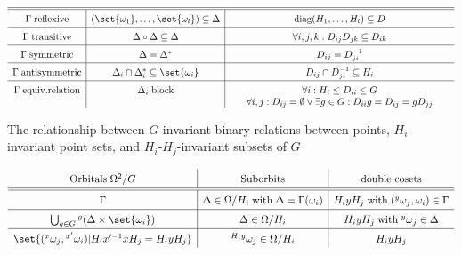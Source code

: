 \documentclass[fontsize=11pt,fleqn,a4paper]{scrartcl}
\begin{document}
\begin{landscape}
\begin{table}[htp]
\[\begin{array}{ c | c | c}
\hline
\hline

\Gamma \;\text{reflexive} & (\set{\omega_1},\ldots,\set{\omega_l})\subseteq\Delta & \diag(H_1,\ldots,H_l) \subseteq D \\

\hline

\Gamma \;\text{transitive} & \Delta\circ\Delta\subseteq\Delta & \forall i,j,k: D_{ij}D_{jk}\subseteq D_{ik} \\

\hline

\Gamma \;\text{symmetric} & \Delta=\Delta^\ast & D_{ij}=D_{ji}^{-1} \\

\hline

\Gamma \;\text{antisymmetric} & \Delta_i\cap\Delta_i^\ast \subseteq\set{\omega_i} & D_{ij}\cap D_{ji}^{-1} \subseteq H_i \\

\hline

\Gamma \;\text{equiv.relation} & \Delta_i \;\text{block} & \parbox[t]{8cm}{\centering $\forall i: H_i\leq D_{ii}\leq G $ \\ $\forall i,j: D_{ij}=\emptyset \vee \exists g\in G: D_{ii}g=D_{ij}=gD_{jj}$} \\
\end{array}\]

\caption{The relationship between $G$-invariant binary relations between points, $H_i$-invariant point sets, and $H_i$-$H_j$-invariant subsets of $G$}
\label{dictionary:table}
\end{table}

\begin{table}[htp]
\[\renewcommand{\arraystretch}{1.5}
\begin{array}{ c | c | c}
\text{Orbitals}\;\Omega^2/G & \text{Suborbits} & \text{double cosets} \\

\hline
\hline

\Gamma & \Delta\in \Omega/H_i\;\text{with}\;\Delta=\Gamma(\omega_i) & H_i y H_j\;\text{with}\;({^y \omega_j},\omega_i)\in\Gamma \\

\hline

\bigcup_{g\in G} {^g(\Delta\times\set{\omega_i})} & \Delta\in \Omega/H_i & H_i y H_j\;\text{with}\;{^y \omega_j} \in \Delta \\

\hline

\set{({^x\omega_j}, {^{x'}\omega_i}) | H_i x'^{-1}x H_j = H_i y H_j} & {^{H_i y}\omega_j}\in \Omega/H_i & H_i y H_j \\


\end{array}\]
\end{table}
\end{landscape}
\end{document}
